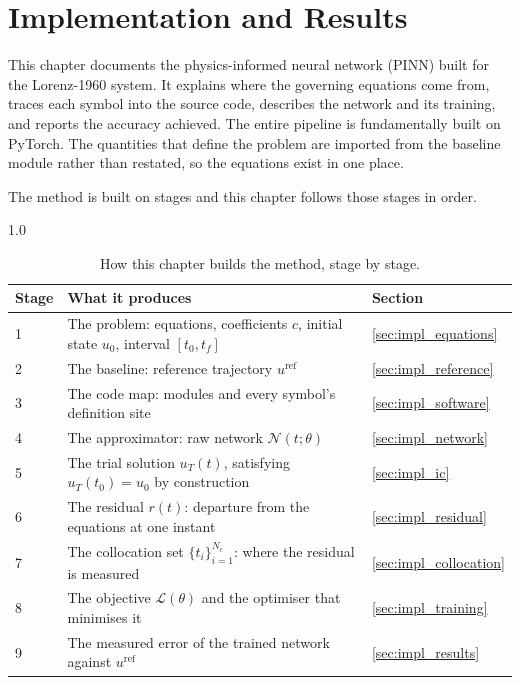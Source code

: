 \chapter{Implementation and Results}

This chapter documents the physics-informed neural network (PINN) built for the Lorenz-1960 system. It explains where the governing equations come from, traces each symbol into the source code, describes the network and its training, and reports the accuracy achieved. The entire pipeline is fundamentally built on PyTorch. The quantities that define the problem are imported from the baseline module rather than restated, so the equations exist in one place.

The method is built on stages and this chapter follows those stages in order.

\begin{table}[H]
\centering
\caption{How this chapter builds the method, stage by stage.}
\label{tab:roadmap}
\begin{spacing}{1.0}
\small
\begin{tabularx}{\textwidth}{|p{1.0cm}|>{\raggedright\arraybackslash}X|p{2.6cm}|}
\hline
\textbf{Stage} & \textbf{What it produces} & \textbf{Section} \\
\hline
1 & The problem: equations, coefficients $c$, initial state $u_0$, interval $[t_0, t_f]$ & \ref{sec:impl_equations} \\
\hline
2 & The baseline: reference trajectory $u^{\mathrm{ref}}$ & \ref{sec:impl_reference} \\
\hline
3 & The code map: modules and every symbol's definition site & \ref{sec:impl_software} \\
\hline
4 & The approximator: raw network $\mathcal{N}(t;\theta)$ & \ref{sec:impl_network} \\
\hline
5 & The trial solution $u_T(t)$, satisfying $u_T(t_0) = u_0$ by construction & \ref{sec:impl_ic} \\
\hline
6 & The residual $r(t)$: departure from the equations at one instant & \ref{sec:impl_residual} \\
\hline
7 & The collocation set $\{t_i\}_{i=1}^{N_c}$: where the residual is measured & \ref{sec:impl_collocation} \\
\hline
8 & The objective $\mathcal{L}(\theta)$ and the optimiser that minimises it & \ref{sec:impl_training} \\
\hline
9 & The measured error of the trained network against $u^{\mathrm{ref}}$ & \ref{sec:impl_results} \\
\hline
\end{tabularx}
\end{spacing}
\end{table}

